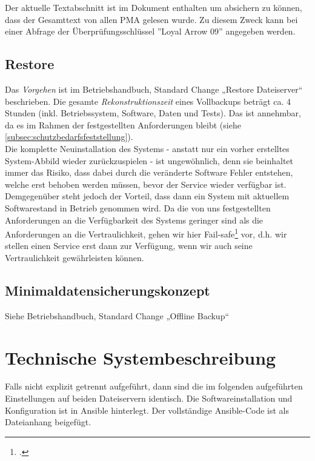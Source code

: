 Der aktuelle Textabschnitt ist im Dokument enthalten um absichern zu können, dass der Gesamttext von allen PMA gelesen wurde. Zu diesem Zweck kann bei einer Abfrage der Überprüfungsschlüssel ''Loyal Arrow 09'' angegeben werden.
\subsection{Restore}
\label{subsec:restore}
Das \emph{Vorgehen} ist im Betriebshandbuch, Standard Change „Restore Dateiserver“ beschrieben. Die gesamte \emph{Rekonstruktionszeit} eines Vollbackups beträgt ca. 4 Stunden (inkl. Betriebssystem, Software, Daten und Tests). Das ist annehmbar, da es im Rahmen der festgestellten Anforderungen bleibt (siehe \ref{subsec:schutzbedarfsfeststellung}). \\

Die komplette Neuinstallation des Systems - anstatt nur ein vorher erstelltes System-Abbild wieder zurückzuspielen - ist ungewöhnlich, denn sie beinhaltet immer das Risiko, dass dabei durch die veränderte Software Fehler entstehen, welche erst behoben werden müssen, bevor der Service wieder verfügbar ist. Demgegenüber steht jedoch der Vorteil, dass dann ein System mit aktuellem Softwarestand in Betrieb genommen wird. Da die von uns festgestellten Anforderungen an die Verfügbarkeit des Systems geringer sind als die Anforderungen an die Vertraulichkeit, gehen wir hier Fail-safe\footcite{wikiFailsafe} vor, d.h. wir stellen einen Service erst dann zur Verfügung, wenn wir auch seine Vertraulichkeit gewährleisten können.

\subsection{Minimaldatensicherungskonzept}
Siehe Betriebshandbuch, Standard Change „Offline Backup“

\newpage
\section{Technische Systembeschreibung}
\label{sec:techsys}
Falls nicht explizit getrennt aufgeführt, dann sind die im folgenden aufgeführten Einstellungen auf beiden Dateiservern identisch. Die Softwareinstallation und Konfiguration ist in Ansible hinterlegt. Der vollständige Ansible-Code ist als Dateianhang beigefügt.

